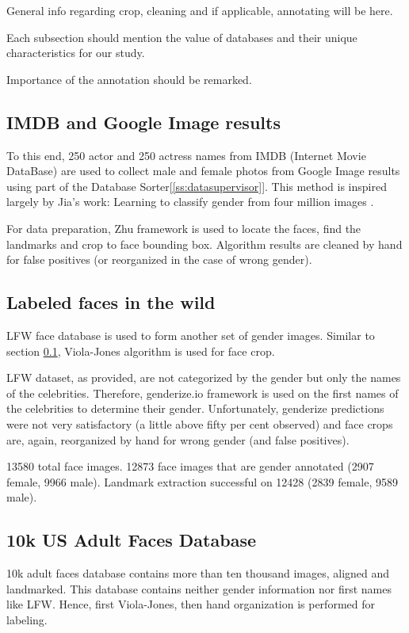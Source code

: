 \documentclass[runningheads]{llncs}
\begin{document}
General info regarding crop, cleaning and if applicable, annotating will be here.

Each subsection should mention the value of databases and their unique characteristics for our study.

Importance of the annotation\cite{mathias2014face} should be remarked.


\subsection{IMDB and Google Image results}\label{[ss-dbGenderGoogleImages]}

To this end, 250 actor and 250 actress names from IMDB (Internet Movie DataBase) are used to collect male and female photos from Google Image results using part of the Database Sorter\ref{[ss:datasupervisor]}. This method is inspired largely by Jia's work: Learning to classify gender from four million images
\cite{jia2015learning}.

For data preparation, Zhu framework\cite{zhu2012face} is used to locate the faces, find the landmarks and crop to face bounding box. Algorithm results are cleaned by hand for false positives (or reorganized in the case of wrong gender).

\subsection{Labeled faces in the wild}\label{ss-dbLFW}
LFW\cite{LFWTech} face database is used to form another set of gender images. Similar to section \ref{[ss-dbGenderGoogleImages]}, Viola-Jones algorithm is used for face crop.

LFW dataset, as provided, are not categorized by the gender but only the names of the celebrities. Therefore, genderize.io framework is used on the first names of the celebrities to determine their gender. Unfortunately, genderize predictions were not very satisfactory (a little above fifty per cent observed) and face crops are, again, reorganized by hand for wrong gender (and false positives).

13580 total face images. 12873 face images that are gender annotated (2907 female, 9966 male). Landmark extraction successful on 12428 (2839 female, 9589 male).


\subsection{10k US Adult Faces Database}\label{ss-db10k}
10k adult faces\cite{bainbridge2013intrinsic} database contains more than ten thousand images, aligned and landmarked. This database contains neither gender information nor first names like LFW. Hence, first Viola-Jones, then hand organization is performed for labeling.
\end{document}
